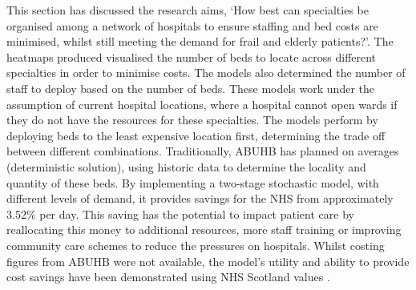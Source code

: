 \documentclass[../thesis.tex]{subfiles}
\begin{document}
\begin{table}[h!]
    \centering{}
    \caption{The total yearly VSS values for each of the three years by experiment. Note that year 3 was a leap year and therefore contains 366 days which accounts for the variation between years.}
    \label{tab:vsscomparisons}
\end{table}

This section has discussed the research aims, `How best can specialties be organised among a network of hospitals to ensure
staffing and bed costs are minimised, whilst still meeting the demand for frail and elderly patients?'. The heatmaps produced visualised the number of beds to locate across different specialties in order to minimise costs. The models also determined the number of staff to deploy based on the number of beds. These models work under the assumption of current hospital locations, where a hospital cannot open wards if they do not have the resources for these specialties. The models perform by deploying beds to the least expensive location first, determining the trade off between different combinations. Traditionally, ABUHB has planned on averages (deterministic solution), using historic data to determine the locality and quantity of these beds. By implementing a two-stage stochastic model, with different levels of demand, it provides savings for the NHS from approximately 3.52\% per day. This saving has the potential to impact patient care by reallocating this money to additional resources, more staff training or improving community care schemes to reduce the pressures on hospitals. Whilst costing figures from ABUHB were not available, the model's utility and ability to provide cost savings have been demonstrated using NHS Scotland values \cite{PHS2021}.
\end{document}
